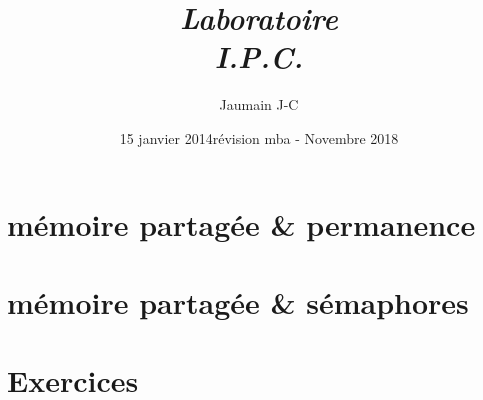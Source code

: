\documentclass[french,10pt,A4]{report}
\begin{document}
\rfoot{\today}
\cfoot{ }
\renewcommand{\footrulewidth}{0.4pt}

\setlength{\parindent}{0pt} %

\lstset{frame=trBL}

\setcounter{tocdepth}{1}	%
\setcounter{secnumdepth}{5}	%

\newcommand{\titre}{Titre du sujet}	%

\thispagestyle{empty}

\title{\emph{Laboratoire\\\textbf{I.P.C.}}}
\author{Jaumain J-C}
\date{15 janvier 2014}
\date{révision mba - Novembre 2018}
\maketitle
\tableofcontents
\newpage
%
\chapter{mémoire partagée \& permanence}
\chapter{mémoire partagée \& sémaphores}
\chapter{Exercices}
	
\end{document}

